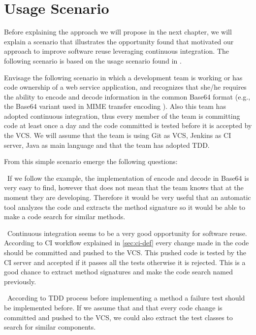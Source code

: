\chapter{Usage Scenario}
\label{usage-scenario}
Before explaining the approach we will propose in the next chapter, we will explain a scenario that illustrates the opportunity found that motivated our approach to improve software reuse leveraging continuous integration. The following scenario is based on the usage scenario found in \cite{Kessel2016}.

Envisage the following scenario in which a development team is working or has code ownership of a web service application, and recognizes that she/he requires the ability to encode and decode information in the common Base64 format (e.g., the Base64 variant used in MIME transfer encoding \citep{rfc2045}). Also this team has adopted continuous integration, thus every member of the team is committing code at least once a day and the code committed is tested before it is accepted by the VCS. We will assume that the team is using Git as VCS, Jenkins as CI server, Java as main language and that the team has adopted TDD.

From this simple scenario emerge the following questions:

\begin{description}[style=nextline]
\item[How might the team realize that what they are working on has not been developed already?] \hfill \
If we follow the example, the implementation of encode and decode in Base64 is very easy to find, however that does not mean that the team knows that at the moment they are developing. Therefore it would be very useful that an automatic tool analyzes the code and extracts the method signature so it would be able to make a code search for similar methods.
\item[How might we seize continuous integration in order to improve software reuse?] \hfill \
Continuous integration seems to be a very good opportunity for software reuse. According to CI workflow explained in \ref{sec:ci-def} every change made in the code should be committed and pushed to the VCS. This pushed code is tested by the CI server and accepted if it passes all the tests otherwise it is rejected. This is a good chance to extract method signatures and make the code search named previously.
\item[Would TDD be helpful?] \hfill \
According to TDD process before implementing a method a failure test should be implemented before. If we assume that and that every code change is committed and pushed to the VCS, we could also extract the test classes to search for similar components.
\end{description}